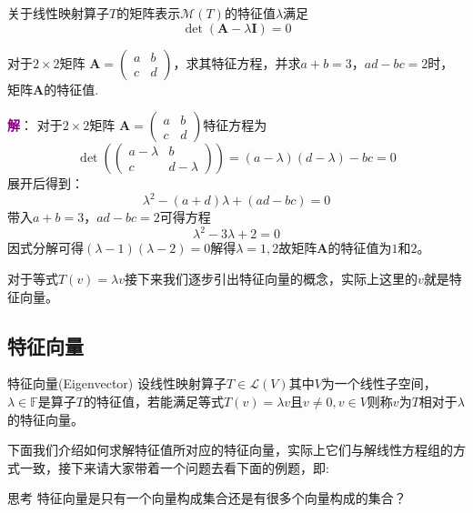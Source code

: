 \begin{corollary}
	关于线性映射算子$T$的矩阵表示$\mathcal{M}(T)$的特征值$\lambda$满足$$\det(\mathbf{A} - \lambda \mathbf{I}) = 0$$
\end{corollary}

\begin{example}
	对于$2\times 2$矩阵 $ \mathbf{A} = \begin{pmatrix} a & b \\ c & d \end{pmatrix} $，求其特征方程，并求$a+b=3$，$ad-bc=2$时，矩阵$\mathbf{A}$的特征值.

	\tcblower
	\textcolor{purple}{\textbf{解}}： 对于$2\times 2$矩阵 $ \mathbf{A} = \begin{pmatrix} a & b \\ c & d \end{pmatrix} $特征方程为$$\det\left( \begin{pmatrix} a-\lambda & b \\ c & d-\lambda \end{pmatrix} \right) = (a-\lambda)(d-\lambda) - bc = 0$$展开后得到：$$\lambda^2 - (a+d)\lambda + (ad - bc) = 0$$带入$a+b=3$，$ad-bc=2$可得方程$$\lambda^2 - 3\lambda + 2 = 0$$因式分解可得$(\lambda-1)(\lambda-2)=0$解得$\lambda=1,2$故矩阵$\mathbf{A}$的特征值为$1$和$2$。
\end{example}

对于等式$T(v)=\lambda v$接下来我们逐步引出特征向量的概念，实际上这里的$v$就是特征向量。

\subsection{特征向量}

\begin{definition}{特征向量(Eigenvector)}
	设线性映射算子$T\in\mathcal{L}(V)$其中$V$为一个线性子空间，$\lambda \in \mathbb{F}$是算子$T$的特征值，若能满足等式$T(v)=\lambda v$且$v\neq 0,v\in V$则称$v$为$T$相对于$\lambda$的特征向量。
\end{definition}

下面我们介绍如何求解特征值所对应的特征向量，实际上它们与解线性方程组的方式一致，接下来请大家带着一个问题去看下面的例题，即:

\begin{ascolorbox1}{思考}
	特征向量是只有一个向量构成集合还是有很多个向量构成的集合？
\end{ascolorbox1}

